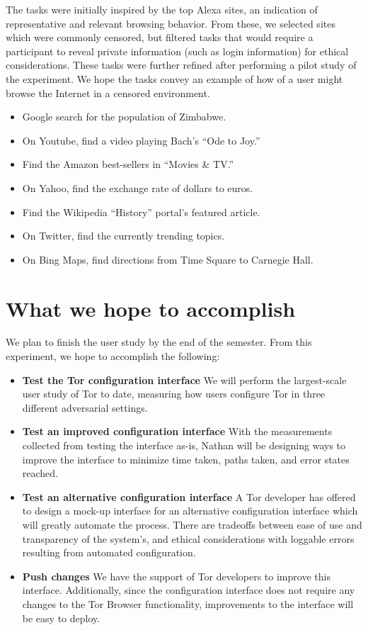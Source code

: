 \documentclass{template}
\begin{document}
The tasks were initially inspired by the top Alexa sites, 
an indication of representative and relevant browsing behavior. 
From these, we selected sites which were commonly censored, 
but filtered tasks that would require a participant to reveal private information 
(such as login information) for ethical considerations. These tasks
were further refined after performing a pilot study of the experiment. 
We hope the tasks convey an example of how of a user might 
browse the Internet in a censored environment. 

\begin{itemize} \itemsep1pt \parskip0pt 
\item Google search for the population of Zimbabwe. 
\item On Youtube, find a video playing Bach's ``Ode to Joy.'' 
\item Find the Amazon best-sellers in ``Movies \& TV.''
\item On Yahoo, find the exchange rate of dollars to euros.
\item Find the Wikipedia ``History'' portal's featured article. 
\item On Twitter, find the currently trending topics.
\item On Bing Maps, find directions from Time Square to Carnegie Hall.
\end{itemize}

\section{What we hope to accomplish}

We plan to finish the user study by the end of the semester. 
From this experiment, we hope to accomplish the following: 

\begin{itemize} \itemsep1pt \parskip0pt 
\item {\bfseries Test the Tor configuration interface} We will perform the largest-scale user study 
of Tor to date, measuring how users configure Tor in three different adversarial settings. 
\item {\bfseries Test an improved configuration interface} With the measurements collected
from testing the interface as-is, Nathan will be designing ways to improve the interface to minimize
time taken, paths taken, and error states reached.
\item {\bfseries Test an alternative configuration interface} A Tor developer has offered
to design a mock-up interface for an alternative configuration interface which will
greatly automate the process. There are tradeoffs between ease of use and transparency
of the system's, and ethical considerations with loggable errors resulting from automated configuration. 
\item {\bfseries Push changes} We have the support of Tor developers
to improve this interface. Additionally, since the configuration interface does not require 
any changes to the Tor Browser functionality, improvements to the interface will
be easy to deploy. 
\end{itemize}
\end{document}
